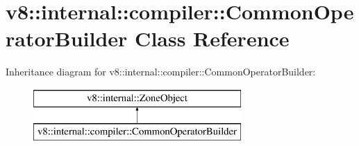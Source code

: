\hypertarget{classv8_1_1internal_1_1compiler_1_1_common_operator_builder}{}\section{v8\+:\+:internal\+:\+:compiler\+:\+:Common\+Operator\+Builder Class Reference}
\label{classv8_1_1internal_1_1compiler_1_1_common_operator_builder}
Inheritance diagram for v8\+:\+:internal\+:\+:compiler\+:\+:Common\+Operator\+Builder\+:\begin{figure}[H]
\begin{center}
\leavevmode
\includegraphics[height=2.000000cm]{classv8_1_1internal_1_1compiler_1_1_common_operator_builder}
\end{center}
\end{figure}
